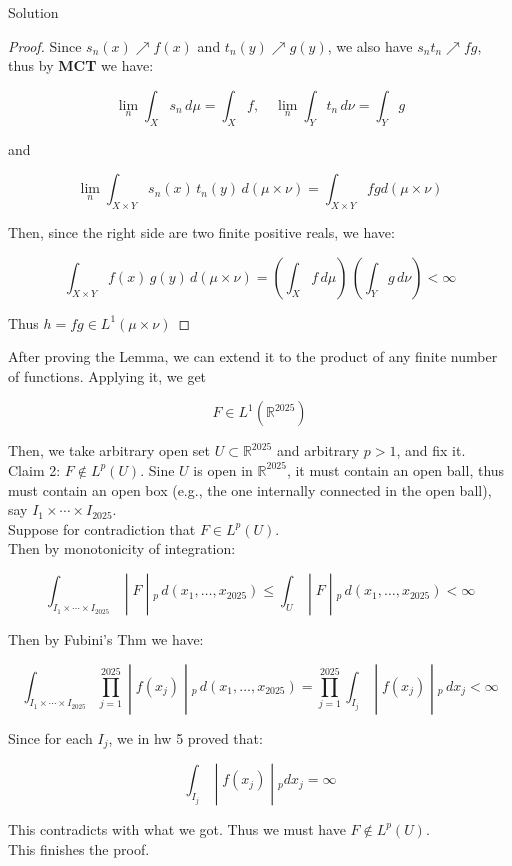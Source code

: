 \begin{qlsolution}{Solution}
\begin{proof}
Since \(s_{n}(x)\operatorname{\nearrow }f(x)\) and \(t_{n}(y)\operatorname{\nearrow }g(y)\), we also have \(s_{n}t_{n}\operatorname{\nearrow }fg\), thus by \textbf{MCT} we have:

\[\lim\limits_{n}\int_{X}s_{n}\, d\mu = \int_{X}f,\quad\lim\limits_{n}\int_{Y}t_{n}\, d\nu = \int_{Y}g\]

and

\[\lim\limits_{n}\int_{X \times Y}s_{n}(x)\, t_{n}(y)\, d(\mu \times \nu) = \int_{X \times Y}fg d(\mu \times \nu)\]

Then, since the right side are two finite positive reals, we have:

\[\int_{X \times Y}f(x)\, g(y)\, d(\mu \times \nu) = (\int_{X}f\, d\mu)\,(\int_{Y}g\, d\nu) < \infty\]

Thus \(h = fg \in L^{1}(\mu \times \nu)\)

\end{proof}

After proving the Lemma, we can extend it to the product of any finite number of functions. Applying it, we get

\[F \in L^{1}(\mathbb{R}^{2025})\]

Then, we take arbitrary open set \(U \subset \mathbb{R}^{2025}\) and arbitrary \(p > 1\), and fix it.\\
Claim 2: \(F \notin L^{p}(U)\). Sine \(U\) is open in \(\mathbb{R}^{2025}\), it must contain an open ball, thus must contain an open box (e.g., the one internally connected in the open ball), say \(I_{1} \times \cdots \times I_{2025}\).\\
Suppose for contradiction that \(F \in L^{p}(U)\).\\
Then by monotonicity of integration:

\[\left. \int_{I_{1} \times \cdots \times I_{2025}} \middle| F \middle| {}_{p}\, d(x_{1},\ldots,x_{2025}) \leq \int_{U} \middle| F \middle| {}_{p}\, d(x_{1},\ldots,x_{2025}) < \infty \right.\]

Then by Fubini's Thm we have:

\[\left. \int_{I_{1} \times \cdots \times I_{2025}}\prod\limits_{j = 1}^{2025} \middle| f(x_{j}) \middle| {}_{p}\, d(x_{1},\ldots,x_{2025}) = \prod\limits_{j = 1}^{2025}\int_{I_{j}} \middle| f(x_{j}) \middle| {}_{p}\, dx_{j} < \infty \right.\]

Since for each \(I_{j}\), we in hw 5 proved that:

\[\left. \int_{I_{j}} \middle| f(x_{j}) \middle| {}_{p} dx_{j} = \infty \right.\]

This contradicts with what we got. Thus we must have \(F \notin L^{p}(U)\).\\
This finishes the proof.

\end{qlsolution}

